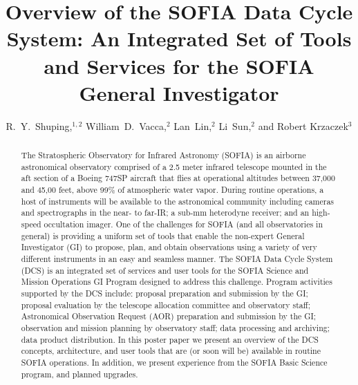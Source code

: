 
\resetcounters


\title{Overview of the SOFIA Data Cycle System:  An Integrated Set of Tools and Services for the SOFIA General Investigator}
\author{R.~Y.~Shuping,$^{1,2}$ William~D.~Vacca,$^2$ Lan~Lin,$^2$ Li~Sun,$^2$ and Robert Krzaczek$^3$
}



\begin{abstract}
The Stratospheric Observatory for Infrared Astronomy (SOFIA) is an airborne astronomical observatory comprised of a 2.5 meter infrared telescope mounted in the aft section of a Boeing 747SP aircraft that flies at operational altitudes between 37,000 and 45,00 feet, above 99\% of atmospheric water vapor. During routine operations, a host of instruments will be available to the astronomical community including cameras and spectrographs in the near- to far-IR; a sub-mm heterodyne receiver; and an high-speed occultation imager. One of the challenges for SOFIA (and all observatories in general) is providing a uniform set of tools that enable the non-expert General Investigator (GI) to propose, plan, and obtain observations using a variety of very different instruments in an easy and seamless manner. The SOFIA Data Cycle System (DCS) is an integrated set of services and user tools for the SOFIA Science and Mission Operations GI Program designed to address this challenge. Program activities supported by the DCS include:  
proposal preparation and submission by the GI; 
proposal evaluation by the telescope allocation committee and observatory staff;
 Astronomical Observation Request (AOR) preparation and submission by the GI;
 observation and mission planning by observatory staff;
 data processing and archiving;
 data product distribution.
In this poster paper we present an overview of the DCS concepts, architecture, and user tools that are (or soon will be) available in routine SOFIA operations. In addition, we present experience from the SOFIA Basic Science program, and planned upgrades.
\end{abstract}

